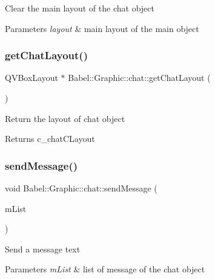 Clear the main layout of the chat object 
\begin{DoxyParams}{Parameters}
{\em layout} & main layout of the main object \\
\hline
\end{DoxyParams}
\mbox{\label{classBabel_1_1Graphic_1_1chat_a9ff3d31756ce9ec6d3116bd1d198ba44}} 
\subsubsection{\texorpdfstring{get\+Chat\+Layout()}{getChatLayout()}}
{\footnotesize\ttfamily Q\+V\+Box\+Layout $\ast$ Babel\+::\+Graphic\+::chat\+::get\+Chat\+Layout (\begin{DoxyParamCaption}{ }\end{DoxyParamCaption})}

Return the layout of chat object \begin{DoxyReturn}{Returns}
c\+\_\+chat\+C\+Layout 
\end{DoxyReturn}
\mbox{\label{classBabel_1_1Graphic_1_1chat_a24150aefa221f4247451b725beb507f1}} 
\subsubsection{\texorpdfstring{send\+Message()}{sendMessage()}\hspace{0.1cm}{\footnotesize\ttfamily [1/2]}}
{\footnotesize\ttfamily void Babel\+::\+Graphic\+::chat\+::send\+Message (\begin{DoxyParamCaption}\item[{Q\+List$<$ Q\+Pair$<$ Q\+String, Q\+String $>$$>$}]{m\+List }\end{DoxyParamCaption})}

Send a message text 
\begin{DoxyParams}{Parameters}
{\em m\+List} & list of message of the chat object \\
\hline
\end{DoxyParams}
\mbox{\label{classBabel_1_1Graphic_1_1chat_af54d04ad8dace079d8c72e434a9049dd}} 
